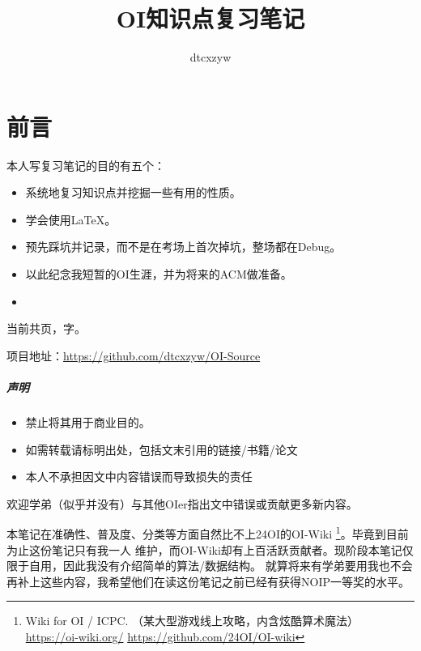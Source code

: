 \documentclass[10pt,AutoFakeBold,AutoFakeSlant,b5paper]{book}
\begin{document}

\title{OI知识点复习笔记}
\author{dtcxzyw}
\frontmatter
\maketitle
\chapter{前言}
本人写复习笔记的目的有五个：
\begin{itemize}
	\item 系统地复习知识点并挖掘一些有用的性质。
	\item 学会使用\LaTeX{}。
	\item 预先踩坑并记录，而不是在考场上首次掉坑，整场都在Debug。
	\item 以此纪念我短暂的OI生涯，并为将来的ACM做准备。
	\item {}
\end{itemize}

当前共\pageref{LastPage}页，字。

项目地址：\url{https://github.com/dtcxzyw/OI-Source}

\paragraph{声明}
{\bfseries
\begin{itemize}
    \item 禁止将其用于商业目的。
    \item 如需转载请标明出处，包括文末引用的链接/书籍/论文
    \item 本人不承担因文中内容错误而导致损失的责任
\end{itemize}
}

欢迎学弟（似乎并没有）与其他OIer指出文中错误或贡献更多新内容。

本笔记在准确性、普及度、分类等方面自然比不上24OI的OI-Wiki
\footnote{Wiki for OI / ICPC. （某大型游戏线上攻略，内含炫酷算术魔法）
\url{https://oi-wiki.org/}
\url{https://github.com/24OI/OI-wiki}}。毕竟到目前为止这份笔记只有我一人
维护，而OI-Wiki却有上百活跃贡献者。现阶段本笔记仅限于自用，因此我没有介绍简单的算法/数据结构。
就算将来有学弟要用我也不会再补上这些内容，我希望他们在读这份笔记之前已经有获得NOIP一等奖的水平。

\renewcommand\contentsname{目录}
\tableofcontents
\mainmatter
\adjustmtc



















\appendix

\printindex

\backmatter

\end{document}
